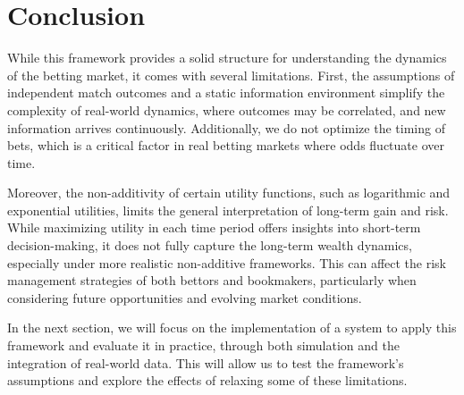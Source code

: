 \section{Conclusion}

While this framework provides a solid structure for understanding the dynamics of the betting market, it comes with several limitations. First, the assumptions of independent match outcomes and a static information environment simplify the complexity of real-world dynamics, where outcomes may be correlated, and new information arrives continuously. Additionally, we do not optimize the timing of bets, which is a critical factor in real betting markets where odds fluctuate over time.

Moreover, the non-additivity of certain utility functions, such as logarithmic and exponential utilities, limits the general interpretation of long-term gain and risk. While maximizing utility in each time period offers insights into short-term decision-making, it does not fully capture the long-term wealth dynamics, especially under more realistic non-additive frameworks. This can affect the risk management strategies of both bettors and bookmakers, particularly when considering future opportunities and evolving market conditions.

In the next section, we will focus on the implementation of a system to apply this framework and evaluate it in practice, through both simulation and the integration of real-world data. This will allow us to test the framework's assumptions and explore the effects of relaxing some of these limitations.
